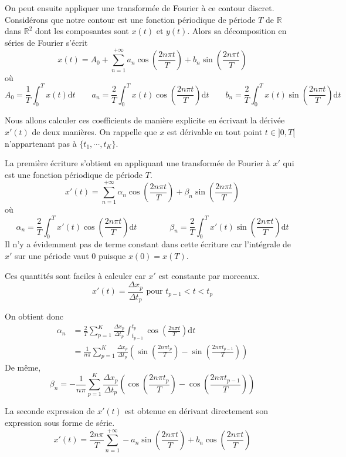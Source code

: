 On peut ensuite appliquer une transformée de Fourier à ce contour 
discret. 
Considérons que notre contour est une fonction périodique de 
période $T$ de $\mathbb{R}$ dans $\mathbb{R}^2$ dont les composantes 
sont $x(t)$ et $y(t)$.
Alors sa décomposition en séries de Fourier s'écrit
\[
x(t) = A_0 + \sum_{n = 1}^{+\infty} a_n \cos\left(\frac{2n\pi t}{T}\right) 
  + b_n \sin\left(\frac{2n\pi t}{T}\right) 
\]
où
\[
A_0 = \frac{1}{T} \int_{0}^{T} x(t) \mathrm{d}t  \qquad
a_n = \frac{2}{T} \int_{0}^{T} x(t) \cos\left(\frac{2n\pi t}{T}\right)  \mathrm{d}t  \qquad
b_n = \frac{2}{T} \int_{0}^{T} x(t) \sin\left(\frac{2n\pi t}{T}\right)  \mathrm{d}t 
\]

Nous allons calculer ces coefficients de manière explicite en écrivant 
la dérivée $x'(t)$ de deux manières.
On rappelle que $x$ est dérivable en tout point $t \in ]0, T[$ 
n'appartenant pas à $\{ t_1, \cdots, t_K \}$.

La première écriture s'obtient en appliquant une transformée de Fourier 
à $x'$ qui est une fonction périodique de période $T$. 
\[
x'(t) = \sum_{n = 1}^{+\infty} \alpha_n \cos\left(\frac{2n\pi t}{T}\right) 
  + \beta_n \sin\left(\frac{2n\pi t}{T}\right) 
\]
où
\[
\alpha_n = \frac{2}{T} \int_{0}^{T} x'(t) \cos\left(\frac{2n\pi t}{T}\right)  \mathrm{d}t  \qquad \qquad
\beta_n = \frac{2}{T} \int_{0}^{T} x'(t) \sin\left(\frac{2n\pi t}{T}\right)  \mathrm{d}t 
\]
Il n'y a évidemment pas de terme constant dans cette écriture car 
l'intégrale de $x'$ sur une période vaut 0 puisque $x(0) = x(T)$.

Ces quantités sont faciles à calculer car $x'$ est constante par 
morceaux.
\[
x'(t) = \frac{\Delta x_p}{\Delta t_p} \text{ pour } t_{p-1} < t < t_p
\]

On obtient donc
\begin{align*}
\alpha_n &= \frac{2}{T} \sum_{p = 1}^{K} \frac{\Delta x_p}{\Delta t_p} \int_{t_{p-1}}^{t_p} \cos\left(\frac{2n\pi t}{T}\right)  \mathrm{d}t  \\
         &= \frac{1}{n \pi} \sum_{p = 1}^{K} \frac{\Delta x_p}{\Delta t_p} \left( \sin\left(\frac{2n\pi t_p}{T}\right) - \sin\left(\frac{2n\pi t_{p-1}}{T}\right)  \right)
\end{align*}
De même, 
\[
\beta_n = -\frac{1}{n \pi} \sum_{p = 1}^{K} \frac{\Delta x_p}{\Delta t_p} \left( \cos\left(\frac{2n\pi t_p}{T}\right) - \cos\left(\frac{2n\pi t_{p-1}}{T}\right)  \right)
\]

La seconde expression de $x'(t)$ est obtenue en dérivant directement son 
expression sous forme de série.
\[
x'(t) = \frac{2n\pi}{T}\sum_{n = 1}^{+\infty} -a_n \sin\left(\frac{2n\pi t}{T}\right) 
  + b_n \cos\left(\frac{2n\pi t}{T}\right) 
\]

